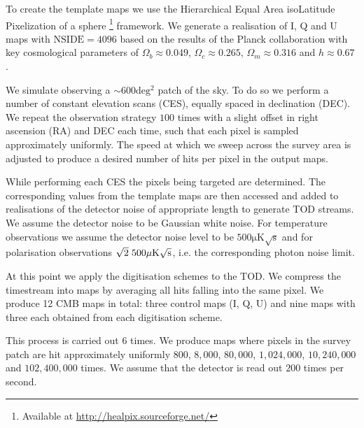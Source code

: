 \documentclass[apj]{emulateapj}
\begin{document}
To create the template maps we use the Hierarchical Equal Area isoLatitude Pixelization of a sphere \citep[HEALPix;][]{healpix}\footnote{Available at \url{http://healpix.sourceforge.net/}} framework. We generate a realisation of I, Q and U maps with $\mathrm{NSIDE} = 4096$ based on the results of the Planck collaboration with key cosmological parameters of $\Omega_b \approx 0.049 $, $\Omega_c \approx 0.265$, $\Omega_m \approx 0.316$ and $h \approx 0.67$ \citep{planck2016}.


We simulate observing a $\sim 600 \mathrm{deg^2}$ patch of the sky. To do so we perform a number of constant elevation scans (CES), equally spaced in declination (DEC). We repeat the observation strategy $100$ times with a slight offset in right ascension (RA) and DEC each time, such that each pixel is sampled approximately uniformly. The speed at which we sweep across the survey area is adjusted to produce a desired number of hits per pixel in the output maps.

While performing each CES the pixels being targeted are determined. The corresponding values from the template maps are then accessed and added to realisations of the detector noise of appropriate length to generate TOD streams. We assume the detector noise to be Gaussian white noise. For temperature observations we assume the detector noise level to be $500 \mathrm{\mu K \sqrt{s}}$ and for polarisation observations $\sqrt{2} \hspace{0.7ex} 500 \mathrm{\mu K \sqrt{s}}$, i.e. the corresponding photon noise limit.

At this point we apply the digitisation schemes to the TOD. We compress the timestream into maps by averaging all hits falling into the same pixel. We produce 12 CMB maps in total: three control maps (I, Q, U) and nine maps with three each obtained from each digitisation scheme.


This process is carried out 6 times. We produce maps where pixels in the survey patch are hit approximately uniformly $800$, $8,000$, $80,000$, $1,024,000$, $10,240,000$ and $102,400,000$ times. We assume that the detector is read out $200$ times per second. %
\end{document}
